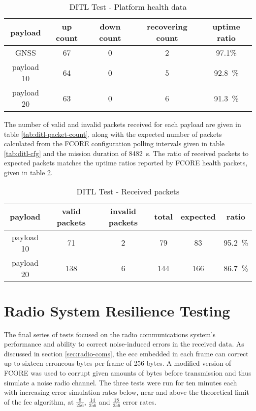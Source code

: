 \begin{table}[h]
\begin{center}
\begin{tabular}{c||c c c|c}

payload & up count & down count & recovering count & uptime ratio \\ \hline
GNSS       & 67 & 0 & 2 & 97.1\% \\
payload 10 & 64 & 0 & 5 & \SI{92.8}{\percent} \\
payload 20 & 63 & 0 & 6 & \SI{91.3}{\percent} \\

\end{tabular}
\end{center}
\caption {DITL Test - Platform health data}
\label{tab:ditl-health}
\end{table}

The number of valid and invalid packets received for each payload are given in
table \ref{tab:ditl-packet-count}, along with the expected number of packets
calculated from the FCORE configuration polling intervals given in table
\ref{tab:ditl-cfg} and the mission duration of \SI{8482}{\second}. The ratio of
received packets to expected packets matches the uptime ratios reported by
FCORE health packets, given in table \ref{tab:ditl-health}.

\begin{table}[h]
\begin{center}
\begin{tabular}{c||c c|c c|c}

payload & valid packets & invalid packets & total & expected & ratio \\
\hline
payload 10 & 71 & 2 & 79 & 83 & \SI{95.2}{\percent} \\
payload 20 & 138 & 6 & 144 & 166 & \SI{86.7}{\percent} \\

\end{tabular}
\end{center}
\caption {DITL Test - Received packets}
\label{tab:ditl-health}
\end{table}

\section{Radio System Resilience Testing}
\label{ssec:results-resilience}

The final series of tests focused on the radio communications system's
performance and ability to correct noise-induced errors in the received data.
As discussed in section \ref{sec:radio-coms}, the \acrfull{ecc} embedded in
each frame can correct up to sixteen erroneous bytes per frame of 256 bytes.
A modified version of FCORE was used to corrupt given amounts of bytes before
transmission and thus simulate a noise radio channel. The three tests were run
for ten minutes each with increasing error simulation rates below, near and
above the theoretical limit of the \acrshort{fec} algorithm, at $\frac{8}{256}$,
$\frac{14}{256}$ and $\frac{18}{256}$ error rates.


